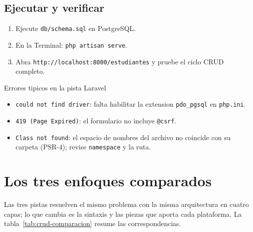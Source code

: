 \subsection{Ejecutar y verificar}
\label{ap:crud:laravel:run}

\begin{enumerate}
\item Ejecute \texttt{db/schema.sql} en PostgreSQL.
\item En la Terminal: \texttt{php artisan serve}.
\item Abra \texttt{http://localhost:8000/estudiantes} y pruebe el ciclo
CRUD completo.
\end{enumerate}

\begin{cajaadvertencia}{Errores tipicos en la pista Laravel}
\begin{itemize}
\item \texttt{could not find driver}: falta habilitar la extension
\texttt{pdo\_pgsql} en \texttt{php.ini}.
\item \texttt{419 (Page Expired)}: el formulario no incluye
\texttt{@csrf}.
\item \texttt{Class not found}: el espacio de nombres del archivo no
coincide con su carpeta (PSR-4); revise \texttt{namespace} y la ruta.
\end{itemize}
\end{cajaadvertencia}

\section{Los tres enfoques comparados}
\label{ap:crud:comparacion}

Las tres pistas resuelven el mismo problema con la misma arquitectura
en cuatro capas; lo que cambia es la sintaxis y las piezas que aporta
cada plataforma. La tabla~\ref{tab:crud-comparacion} resume las
correspondencias.

